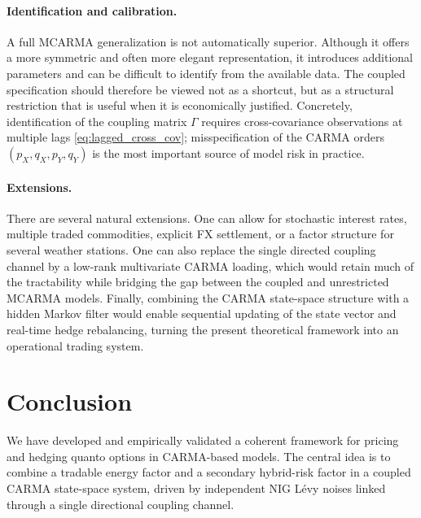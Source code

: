 \documentclass[10pt,reqno]{amsart}
\newcommand{\1}{\mathbbm{1}}
\begin{document}
\paragraph{Identification and calibration.}
A full MCARMA generalization is not automatically superior. Although it offers a
more symmetric and often more elegant representation, it introduces additional
parameters and can be difficult to identify from the available data. The coupled
specification should therefore be viewed not as a shortcut, but as a structural
restriction that is useful when it is economically justified. Concretely,
identification of the coupling matrix $\Gamma$ requires cross-covariance
observations at multiple lags \eqref{eq:lagged_cross_cov}; misspecification of
the CARMA orders $(p_X,q_X,p_Y,q_Y)$ is the most important source of model
risk in practice.

\paragraph{Extensions.}
There are several natural extensions. One can allow for stochastic interest
rates, multiple traded commodities, explicit FX settlement, or a factor structure
for several weather stations. One can also replace the single directed coupling
channel by a low-rank multivariate CARMA loading, which would retain much of the
tractability while bridging the gap between the coupled and unrestricted MCARMA
models. Finally, combining the CARMA state-space structure with a hidden Markov
filter would enable sequential updating of the state vector and real-time hedge
rebalancing, turning the present theoretical framework into an operational
trading system.

\section{Conclusion}\label{sec:conclusion}

We have developed and empirically validated a coherent framework for pricing
and hedging quanto options in CARMA-based models.
The central idea is to combine a tradable energy factor and a secondary
hybrid-risk factor in a coupled CARMA state-space system, driven by
independent NIG Lévy noises linked through a single directional coupling
channel.
\end{document}
